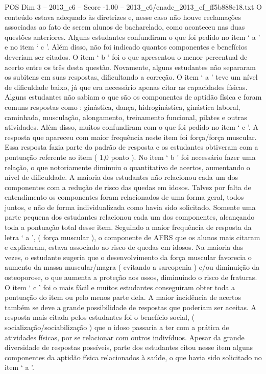 \begin{textsample}{POS Dim 3 – 2013\_c6 – Score -1.00 – 2013\_c6/enade\_2013\_ef\_ff5b888e18.txt}
O conteúdo estava adequado às diretrizes e, nesse caso não houve reclamações associadas ao fato de serem alunos de bacharelado, como aconteceu nas duas questões anteriores.
Alguns estudantes confundiram o que foi pedido no item ‘ a ’ e no item ‘ c ’.
Além disso, não foi indicado quantos componentes e benefícios deveriam ser citados.
O item ‘ b ’ foi o que apresentou o menor percentual de acerto entre os três desta questão.
Novamente, alguns estudantes não separaram os subitens em suas respostas, dificultando a correção.
O item ‘ a ’ teve um nível de dificuldade baixo, já que era necessário apenas citar as capacidades físicas.
Alguns estudantes não sabiam o que são os componentes de aptidão física e foram comuns respostas como : ginástica, dança, hidroginástica, ginástica laboral, caminhada, musculação, alongamento, treinamento funcional, pilates e outras atividades.
Além disso, muitos confundiram com o que foi pedido no item ‘ c ’.
A resposta que apareceu com maior frequência neste item foi força/força muscular.
Essa resposta fazia parte do padrão de resposta e os estudantes obtiveram com a pontuação referente ao item ( 1,0 ponto ).
No item ‘ b ’ foi necessário fazer uma relação, o que notoriamente diminuiu o quantitativo de acertos, aumentando o nível de dificuldade.
A maioria dos estudantes não relacionou cada um dos componentes com a redução de risco das quedas em idosos.
Talvez por falta de entendimento os componentes foram relacionados de uma forma geral, todos juntos, e não de forma individualizada como havia sido solicitado.
Somente uma parte pequena dos estudantes relacionou cada um dos componentes, alcançando toda a pontuação total desse item.
Seguindo a maior frequência de resposta da letra ‘ a ’, ( força muscular ), o componente de AFRS que os alunos mais citaram e explicaram, estava associado ao risco de quedas em idosos.
Na maioria das vezes, o estudante sugeria que o desenvolvimento da força muscular favorecia o aumento da massa muscular/magra ( evitando a sarcopenia ) e/ou diminuição da osteoporose, o que aumenta a proteção aos ossos, diminuindo o risco de fraturas.
O item ‘ c ’ foi o mais fácil e muitos estudantes conseguiram obter toda a pontuação do item ou pelo menos parte dela.
A maior incidência de acertos também se deve a grande possibilidade de respostas que poderiam ser aceitas.
A resposta mais citada pelos estudantes foi o benefício social, ( socialização/sociabilização ) que o idoso passaria a ter com a prática de atividades físicas, por se relacionar com outros indivíduos.
Apesar da grande diversidade de respostas possíveis, parte dos estudantes citou nesse item alguns componentes da aptidão física relacionados à saúde, o que havia sido solicitado no item ‘ a ’.

\end{textsample}
